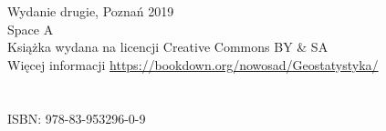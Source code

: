 \thispagestyle{empty}


\let\maketitle\oldmaketitle
\maketitle

\thispagestyle{empty}
\vspace*{\fill}
Wydanie drugie, Poznań 2019 \\
Space A \\
Książka wydana na licencji Creative Commons BY \& SA \\
Więcej informacji \url{https://bookdown.org/nowosad/Geostatystyka/} \\
\\
\\
{\large ISBN: 978-83-953296-0-9}


